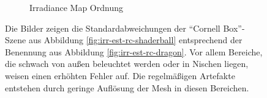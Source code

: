 \begin{figure}[h]
\begin{subfigure}[b]{0.5\textwidth}
			\caption{Irradiance Map Ordnung}
		\end{subfigure}
		\caption[Irradiance-Map anhand der \enquote{Cornell Box}-Szene]{Die Bilder zeigen die Standardabweichungen der \enquote{Cornell Box}-Szene aus Abbildung \ref{fig:irr-est-rc-shaderball} entsprechend der Benennung aus Abbildung \ref{fig:irr-est-rc-dragon}. Vor allem Bereiche, die schwach von außen beleuchtet werden oder in Nischen liegen, weisen einen erhöhten Fehler auf. Die regelmäßigen Artefakte entstehen durch geringe Auflösung der Mesh in diesen Bereichen.}
		\label{fig:irr-map-cornell}
	\end{figure}

